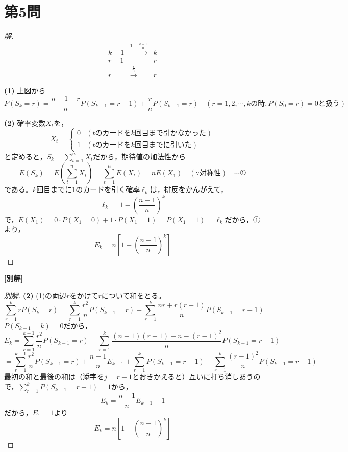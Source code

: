 \documentclass[../main.tex]{subfiles}
\begin{document}
\newpage

\section*{第5問}

\begin{proof}[解]
  \[
    \begin{array}{ccc}
      k-1 & \xrightarrow{1-\frac{k-1}{n}} & k \\
      r-1 & & r \\
      r & \xrightarrow{\frac{r}{n}} & r
    \end{array}
  \]

  \textbf{(1)} 上図から
  \[
    P(S_k=r)=\frac{n+1-r}{n}P(S_{k-1}=r-1)+\frac{r}{n}P(S_{k-1}=r) \quad(r=1,2,\cdots,k\text{の時}, P(S_0=r)=0\text{と扱う})
  \]

  \textbf{(2)} 確率変数$X_t$を，
  \[
    X_t=
    \begin{cases}
      0 & (t\text{のカードを}k\text{回目まで引かなかった}) \\
      1 & (t\text{のカードを}k\text{回目までに引いた})
    \end{cases}
  \]
  と定めると，$S_k=\displaystyle\sum_{t=1}^nX_t$だから，期待値の加法性から
  \[
    E(S_k)=E\left(\sum_{t=1}^nX_t\right)=\sum_{t=1}^nE(X_t)=nE(X_1) \quad(\because\text{対称性}) \quad\cdots\text{①}
  \]
  である。$k$回目までに1のカードを引く確率$\ell_k$は，排反をかんがえて，
  \[
    \ell_k=1-\left(\frac{n-1}{n}\right)^k
  \]
  で，$E(X_1)=0\cdot P(X_1=0)+1\cdot P(X_1=1)=P(X_1=1)=\ell_k$だから，①より，
  \[
    E_k=n\left[1-\left(\frac{n-1}{n}\right)^k\right]
  \]
\end{proof}

\bigskip
\noindent\textbf{[別解]}

\begin{proof}[別解]
  \textbf{(2)} (1)の両辺$r$をかけて$r$について和をとる。
  \[
    \sum_{r=1}^krP(S_k=r)=\sum_{r=1}^k\frac{r^2}{n}P(S_{k-1}=r)+\sum_{r=1}^k\frac{nr+r(r-1)}{n}P(S_{k-1}=r-1)
  \]
  $P(S_{k-1}=k)=0$だから，
  \[
    E_k=\sum_{r=1}^{k-1}\frac{r^2}{n}P(S_{k-1}=r)+\sum_{r=1}^k\frac{(n-1)(r-1)+n-(r-1)^2}{n}P(S_{k-1}=r-1)
  \]
  \[
    =\sum_{r=1}^{k-1}\frac{r^2}{n}P(S_{k-1}=r)+\frac{n-1}{n}E_{k-1}+\sum_{r=1}^kP(S_{k-1}=r-1)-\sum_{r=1}^k\frac{(r-1)^2}{n}P(S_{k-1}=r-1)
  \]
  最初の和と最後の和は（添字を$j=r-1$とおきかえると）互いに打ち消しあうので，$\displaystyle\sum_{r=1}^kP(S_{k-1}=r-1)=1$から，
  \[
    E_k=\frac{n-1}{n}E_{k-1}+1
  \]
  だから，$E_1=1$より
  \[
    E_k=n\left[1-\left(\frac{n-1}{n}\right)^k\right]
  \]
\end{proof}
\end{document}
